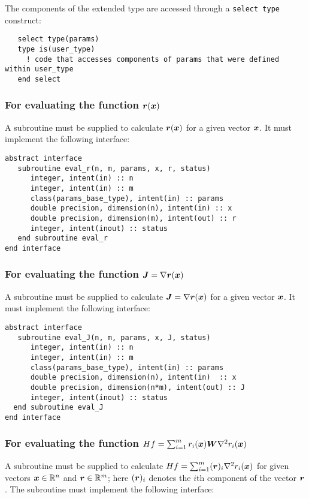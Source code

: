 \documentclass{spec}
\begin{document}
The components of the extended type are accessed through a \texttt{select type}
construct:
\begin{verbatim}
   select type(params)
   type is(user_type)
     ! code that accesses components of params that were defined within user_type
   end select
\end{verbatim}

\subsubsection{For evaluating the function ${\bm r}({\bm x})$}

A subroutine must be supplied to calculate ${\bm r}({\bm x})$ for a given vector ${\bm x}$. 
It must implement the following interface:

\begin{verbatim}
abstract interface
   subroutine eval_r(n, m, params, x, r, status)
      integer, intent(in) :: n
      integer, intent(in) :: m
      class(params_base_type), intent(in) :: params
      double precision, dimension(n), intent(in) :: x
      double precision, dimension(m), intent(out) :: r
      integer, intent(inout) :: status
   end subroutine eval_r
end interface
\end{verbatim}



\subsubsection{For evaluating the function ${\bm J} = \nabla {\bm r}({\bm x})$}
A subroutine must be supplied to calculate ${\bm J} = \nabla {\bm r}({\bm x})$ for a given vector ${\bm x}$. It
must implement the following interface:

\begin{verbatim}
abstract interface
   subroutine eval_J(n, m, params, x, J, status)
      integer, intent(in) :: n
      integer, intent(in) :: m
      class(params_base_type), intent(in) :: params
      double precision, dimension(n), intent(in)  :: x
      double precision, dimension(n*m), intent(out) :: J
      integer, intent(inout) :: status
  end subroutine eval_J
end interface
\end{verbatim}



\subsubsection{For evaluating the function $Hf = \sum_{i=1}^m r_i({\bm x}) {\bm W} \nabla^2 r_i({\bm x})$}
A subroutine must be supplied to calculate $Hf = \sum_{i=1}^m ({\bm r})_i \nabla^2 r_i({\bm x})$ for given vectors ${\bm x} \in \mathbb{R}^n$ and ${\bm r} \in \mathbb{R}^m$; here \(({\bm r})_i\) denotes the $i$th component of the vector ${\bm r}$. The subroutine must implement the following interface:
\end{document}
